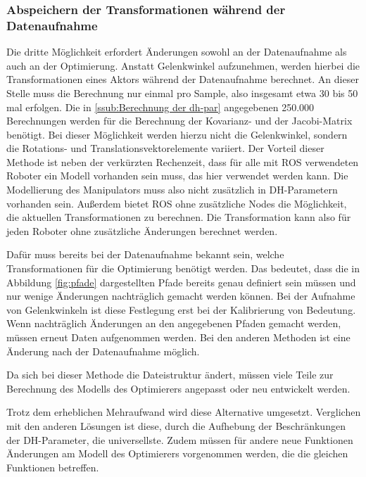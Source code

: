 \subsubsection{Abspeichern der Transformationen während der Datenaufnahme} %
\label{ssub:Abspeichern der Transformationen während der Datenaufnahme}


 Die dritte Möglichkeit erfordert Änderungen sowohl an der Datenaufnahme als auch an der Optimierung.
 Anstatt Gelenkwinkel aufzunehmen, werden hierbei die Transformationen eines Aktors während der Datenaufnahme
 berechnet. An dieser Stelle muss die Berechnung nur einmal pro Sample, also insgesamt etwa 30 bis 50 mal 
 erfolgen. Die in \ref{ssub:Berechnung der dh-par} angegebenen 250.000 Berechnungen werden für die Berechnung 
 der Kovarianz- und der Jacobi-Matrix benötigt. Bei dieser Möglichkeit werden hierzu nicht die Gelenkwinkel,
 sondern die Rotations- und Translationsvektorelemente variiert.
 Der Vorteil dieser Methode ist neben der verkürzten Rechenzeit, dass für alle mit \ac{ROS} verwendeten 
 Roboter ein Modell vorhanden sein muss, das hier verwendet werden kann. Die Modellierung des Manipulators
 muss also nicht zusätzlich in \ac{DH-Parameter}n vorhanden sein. Außerdem 
 bietet \ac{ROS} ohne zusätzliche Nodes die Möglichkeit, die aktuellen Transformationen
 zu berechnen. Die Transformation kann also für jeden Roboter ohne zusätzliche
 Änderungen berechnet werden.
 
 Dafür muss bereits bei der Datenaufnahme bekannt sein, welche Transformationen für die Optimierung benötigt 
 werden. Das bedeutet, dass die in Abbildung \ref{fig:pfade} dargestellten Pfade bereits genau
 definiert sein müssen und nur wenige Änderungen nachträglich gemacht werden können. Bei der 
 Aufnahme von Gelenkwinkeln ist diese Festlegung erst bei der Kalibrierung von Bedeutung. 
 Wenn nachträglich Änderungen an den angegebenen Pfaden gemacht werden, müssen 
 erneut Daten aufgenommen werden. Bei den anderen Methoden ist eine Änderung nach
 der Datenaufnahme möglich.

 Da sich bei dieser Methode die Dateistruktur ändert, müssen viele Teile zur 
 Berechnung des Modells des Optimierers angepasst oder neu entwickelt werden. 

Trotz dem erheblichen Mehraufwand wird diese Alternative umgesetzt. Verglichen 
mit den anderen Lösungen ist diese, durch die Aufhebung der Beschränkungen der 
\ac{DH-Parameter}, die universellste. Zudem müssen für andere neue Funktionen 
Änderungen am Modell des Optimierers vorgenommen werden, die die gleichen 
Funktionen betreffen.

